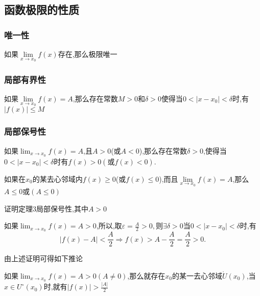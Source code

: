 \documentclass[12pt, a4paper, oneside, UTF8]{ctexbook}  %
\begin{document}
\begin{table}[H]
\begin{tabular}{|l|l|l|l|l|}
    \end{tabular}
\end{table}

\subsection{函数极限的性质}
\subsubsection{唯一性}
\begin{them}{}{}
    如果$\lim\limits_{x\to x_0}f(x)$存在,那么极限唯一
\end{them}
\subsubsection{局部有界性}
\begin{them}{}{}
    如果$\lim\limits_{x\to x_0}f(x)=A$,那么存在常数$M>0$和$\delta >0$使得当$0<|x-x_0|<\delta$时,有$|f(x)| \leq M$
\end{them}
\subsubsection{局部保号性}
\begin{them}{}{}
    如果$\lim_{x\to x_0}f(x)=A$,且$A>0$(或$A<0$),那么存在常数$\delta>0$,使得当$0<|x-x_0|<\delta$时有$f(x)>0(或f(x)<0)$.
\end{them}
\begin{corollary}{}{}
    如果在$x_0$的某去心邻域内$f(x)\geqslant 0$(或$f(x)\leqslant 0$),而且$\underset{x\to x_0}{\operatorname*{lim}}f(x)=A$,那么$A \leqslant 0$或$(A \leq 0)$
\end{corollary}
\begin{problem}
证明定理3局部保号性,其中$A>0$
\end{problem}
\begin{solution}
    如果$\lim_{x\to x_{0}}f(x)=A > 0$,所以,取$\varepsilon=\frac{A}{2}>0,则\exists \delta >0 $当$0<|x-x_0|<\delta$时,有
    $$
        |f(x)-A|<\frac{A}{2}\Rightarrow f(x)>A-\frac{A}{2}=\frac{A}{2}>0.
    $$
\end{solution}
由上述证明可得如下推论
\begin{corollary}{}{}
    如果$\lim_{x\to x_{0}}f(x)=A > 0(A \neq 0)$,那么就存在$x_0$的某一去心邻域$\mathring{U}\left(x_{0}\right)$,当$x\in U^{\circ}(x_{0})$时,就有$|f(x)|>\frac{|A|}{2}$
\end{corollary}
\end{document}
